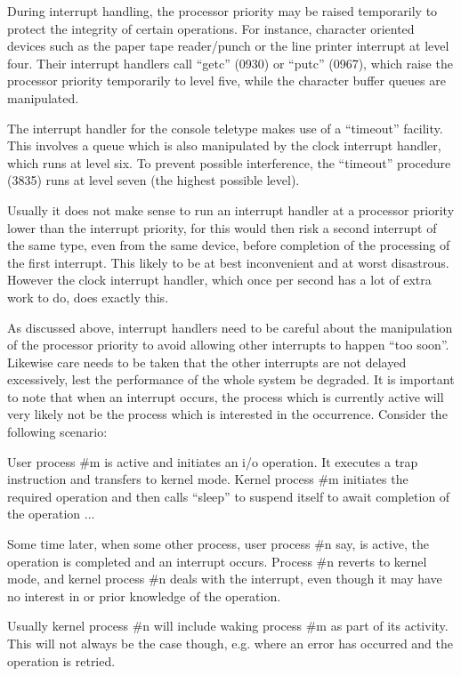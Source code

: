 During interrupt handling, the processor priority may be raised temporarily
to protect the integrity of certain
operations. For instance, character
oriented devices such as the paper tape
reader/punch or the line printer interrupt at level four. Their interrupt
handlers call ``getc'' (0930) or ``putc''
(0967), which raise the processor
priority temporarily to level five,
while the character buffer queues are
manipulated.

The interrupt handler for the console
teletype makes use of a ``timeout''
facility. This involves a queue which
is also manipulated by the clock interrupt handler, which runs at level six.
To prevent possible interference, the
``timeout'' procedure (3835) runs at
level seven (the highest possible
level).


Usually it does not make sense to run
an interrupt handler at a processor
priority lower than the interrupt
priority, for this would then risk a
second interrupt of the same type, even
from the same device, before completion
of the processing of the first interrupt. This likely to be at
best inconvenient and at worst disastrous. However the clock
interrupt handler, which
once per second has a lot of extra work
to do, does exactly this.


As discussed above, interrupt handlers
need to be careful about the manipulation of the processor priority to avoid
allowing other interrupts to happen
``too soon''. Likewise care needs to be
taken that the other interrupts are not
delayed excessively, lest the performance of the whole system be degraded.
It is important to note that when an
interrupt occurs, the process which is
currently active will very likely not
be the process which is interested in
the occurrence. Consider the following
scenario:


User process \#m is active and initiates
an i/o operation. It executes a trap
instruction and transfers to kernel
mode. Kernel process \#m initiates the
required operation and then calls
``sleep'' to suspend itself to await completion of the operation ...

Some time later, when some other process, user process \#n say, is active,
the operation is completed and an
interrupt occurs. Process \#n reverts to
kernel mode, and kernel process \#n
deals with the interrupt, even though
it may have no interest in or prior
knowledge of the operation.


Usually kernel process \#n will include
waking process \#m as part of its
activity. This will not always be the
case though, e.g. where an error has
occurred and the operation is retried.

